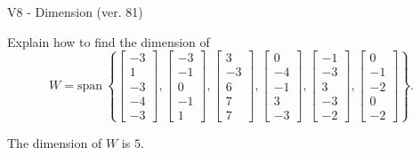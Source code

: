 \begin{exercise}
  \begin{exerciseTitle}V8 - Dimension (ver. 81)\end{exerciseTitle}
  \begin{exerciseStatement}
    Explain how to find the dimension of 
\[W=\mathrm{span}\ \left\{\left[\begin{array}{r}
-3 \\
1 \\
-3 \\
-4 \\
-3
\end{array}\right] , \left[\begin{array}{r}
-3 \\
-1 \\
0 \\
-1 \\
1
\end{array}\right] , \left[\begin{array}{r}
3 \\
-3 \\
6 \\
7 \\
7
\end{array}\right] , \left[\begin{array}{r}
0 \\
-4 \\
-1 \\
3 \\
-3
\end{array}\right] , \left[\begin{array}{r}
-1 \\
-3 \\
3 \\
-3 \\
-2
\end{array}\right] , \left[\begin{array}{r}
0 \\
-1 \\
-2 \\
0 \\
-2
\end{array}\right]\right\}.\]



  \end{exerciseStatement}
  \begin{exerciseAnswer}
   The dimension of \(W\) is  \(5\).
  


  \end{exerciseAnswer}
\end{exercise}